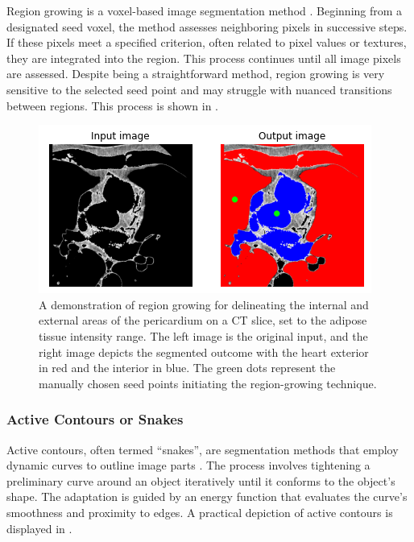 Region growing is a voxel-based image segmentation method \citep{regionGrowing}. Beginning from a designated seed voxel, the method assesses neighboring pixels in successive steps. If these pixels meet a specified criterion, often related to pixel values or textures, they are integrated into the region. This process continues until all image pixels are assessed. Despite being a straightforward method, region growing is very sensitive to the selected seed point and may struggle with nuanced transitions between regions. This process is shown in .

\begin{figure}[b!]
 \centering
 \includegraphics[width=0.7\linewidth]{images/region_growing.png}
 \caption{A demonstration of region growing for delineating the internal and external areas of the pericardium on a CT slice, set to the adipose tissue intensity range. The left image is the original input, and the right image depicts the segmented outcome with the heart exterior in red and the interior in blue. The green dots represent the manually chosen seed points initiating the region-growing technique. \cite{bencevicRecentProgressEpicardial2022}}
 \label{fig:region-growing}
 \end{figure}


\subsubsection{Active Contours or Snakes}

Active contours, often termed ``snakes'', are segmentation methods that employ dynamic curves to outline image parts \citep{Kass1988}. The process involves tightening a preliminary curve around an object iteratively until it conforms to the object's shape. The adaptation is guided by an energy function that evaluates the curve's smoothness and proximity to edges. A practical depiction of active contours is displayed in .

